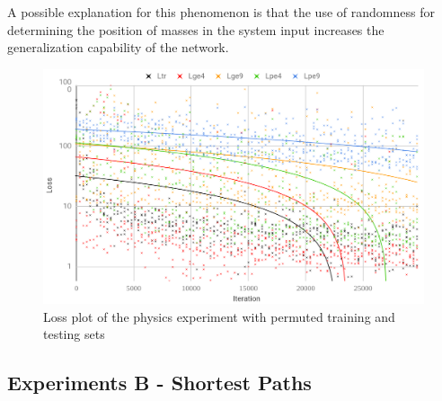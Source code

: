 A possible explanation for this phenomenon is that the use of randomness for determining the position of masses in the system input increases the generalization capability of the network.

\begin{figure}[H]
    \centering
    \includegraphics[width=.9\linewidth]{fig/content/results/physics/physics_perm.png}
    \caption{Loss plot of the physics experiment with permuted training and testing sets}
    \label{fig:physics_perm_results}
\end{figure}

\subsection{Experiments B - Shortest Paths}

